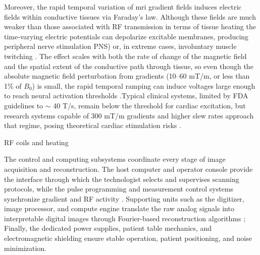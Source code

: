 Moreover, the rapid temporal variation of \gls{mri} gradient fields induces electric fields within conductive tissues via Faraday’s law. Although these fields are much weaker than those associated with RF transmission in terms of tissue heating the time-varying electric potentials can depolarize excitable membranes, producing peripheral nerve stimulation PNS) or, in extreme cases, involuntary muscle twitching \cite{panych2018,Grainger_MHRA_2014}. The effect scales with both the rate of change of the magnetic field and the spatial extent of the conductive path through tissue, so even though the absolute magnetic field perturbation from gradients (10–60 mT/m, or less than 1\% of $B_0$) is small, the rapid temporal ramping can induce voltages large enough to reach neural activation thresholds \cite{Davids:2017aa}.Typical clinical systems, limited by FDA guidelines to $\sim$ 40 T/s, remain below the threshold for cardiac excitation, but research systems capable of 300 mT/m gradients and higher slew rates approach that regime, posing theoretical cardiac stimulation risks \cite{bushberg2011,Prince_MedicalImaging_2015, panych2018}.

RF coils and heating



The control and computing subsystems coordinate every stage of image acquisition and reconstruction. The host computer and operator console provide the interface through which the technologist selects and supervises scanning protocols, while the pulse programming and measurement control systems synchronize gradient and RF activity \cite{bushberg2011}. Supporting units such as the digitizer, image processor, and compute engine translate the raw analog signals into interpretable digital images through Fourier-based reconstruction algorithms \cite{Prince_MedicalImaging_2015}; Finally, the dedicated power supplies, patient table mechanics, and electromagnetic shielding ensure stable operation, patient positioning, and noise minimization. 

